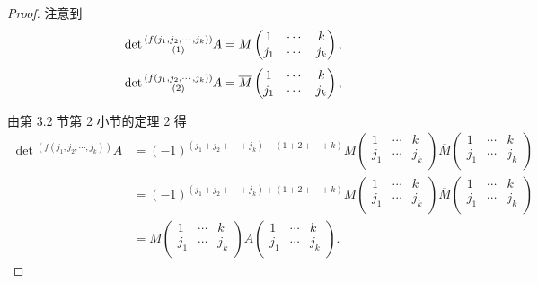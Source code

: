 \documentclass{ctexart}
\begin{document}
\begin{proof}
    注意到
    \[\det\begin{subarray}{c}
    (f(j_1,j_2,\cdots,j_k)) \\
    (1)
    \end{subarray}A=M\begin{pmatrix}
        1 & \cdots & k \\
        j_1 & \cdots & j_k \\
    \end{pmatrix},\]
    \[\det\begin{subarray}{c}
    (f(j_1,j_2,\cdots,j_k)) \\
    (2)
    \end{subarray}A=\overline{M}\begin{pmatrix}
        1 & \cdots & k \\
        j_1 & \cdots & j_k \\
    \end{pmatrix},\]

    由第 3.2 节第 2 小节的定理 2 得
    \begin{align*}
        \det{}^{(f(j_1,j_2,\cdots,j_k))}A & =(-1)^{(j_1+j_2+\cdots+j_k)-(1+2+\cdots+k)}M\begin{pmatrix}
            1 & \cdots & k \\
            j_1 & \cdots & j_k \\
        \end{pmatrix}\overline{M}\begin{pmatrix}
            1 & \cdots & k \\
            j_1 & \cdots & j_k \\
        \end{pmatrix} \\
        & =(-1)^{(j_1+j_2+\cdots+j_k)+(1+2+\cdots+k)}M\begin{pmatrix}
            1 & \cdots & k \\
            j_1 & \cdots & j_k \\
        \end{pmatrix}\overline{M}\begin{pmatrix}
            1 & \cdots & k \\
            j_1 & \cdots & j_k \\
        \end{pmatrix} \\
        & =M\begin{pmatrix}
            1 & \cdots & k \\
            j_1 & \cdots & j_k \\
        \end{pmatrix}A\begin{pmatrix}
            1 & \cdots & k \\
            j_1 & \cdots & j_k \\
        \end{pmatrix}.
    \end{align*}


\end{proof}
\end{document}

